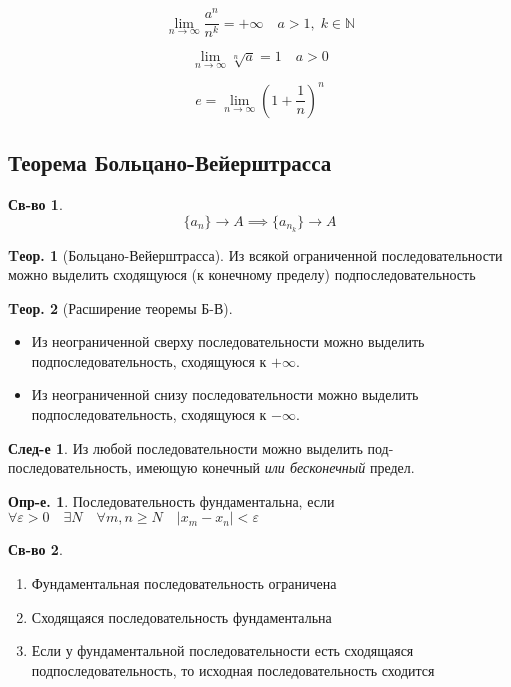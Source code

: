 \documentclass[a4paper,12pt]{article}
\numberwithin{figure}{section}
\theoremstyle{definition}
\newtheorem{definition}{Опр-е.}[section]
\newtheorem*{property}{Св-во}  %
\theoremstyle{definition}
\newtheorem{theorem}{Tеор.}[section]
\newtheorem*{corollary}{След-е} %
\def\eps{\varepsilon}
\def\ntoinf{n \to \infty}
\def\mathN{\mathbb{N}}
\def\geqs{\geqslant}
\begin{document}
\[ \lim_{\ntoinf} \frac{a^n}{n^k} = +\infty \quad a>1, \; k \in \mathN \]

\[ \lim_{\ntoinf} \sqrt[n]{a} = 1 \quad a>0 \]

\[ e = \lim_{\ntoinf}\left( 1 + \frac1n \right)^n \]


\subsection{Теорема Больцано-Вейерштрасса}

\begin{property}
	\[ \{ a_n \} \to A \implies \{ a_{n_k} \} \to A \]
\end{property}

\begin{theorem}[Больцано-Вейерштрасса]
	Из всякой ограниченной последовательности можно выделить сходящуюся (к конечному пределу) подпоследовательность
\end{theorem}

\begin{theorem}[Расширение теоремы Б-В]  \ \\
	\begin{itemize}
		\item Из неограниченной сверху последовательности можно выделить подпоследовательность, сходящуюся к $+\infty$.
		\item Из неограниченной снизу последовательности можно выделить подпоследовательность, сходящуюся к $-\infty$.
	\end{itemize}
\end{theorem}

\begin{corollary}
	Из любой последовательности можно выделить под-последовательность, имеющую конечный \textit{или бесконечный} предел.
\end{corollary}

\begin{definition}
	Последовательность фундаментальна, если
	$\forall \eps>0 \quad \exists N \quad \forall m,n \geqs N \quad |x_m - x_n|<\eps$
\end{definition}

\begin{property} \ \\
	\begin{enumerate}
		\item Фундаментальная последовательность ограничена
		\item Сходящаяся последовательность фундаментальна
		\item Если у фундаментальной последовательности есть сходящаяся подпоследовательность, то исходная последовательность сходится
	\end{enumerate}
\end{property}
\end{document}
